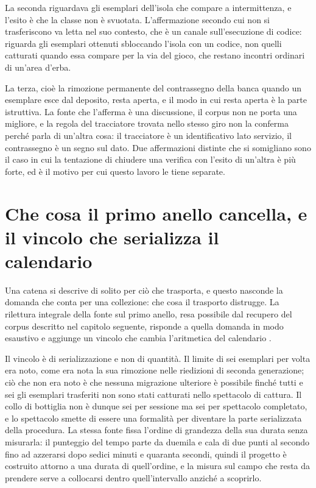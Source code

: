 La seconda riguardava gli esemplari dell'isola che compare a intermittenza, e l'esito è che la classe non è svuotata. L'affermazione secondo cui non si trasferiscono va letta nel suo contesto, che è un canale sull'esecuzione di codice: riguarda gli esemplari ottenuti sbloccando l'isola con un codice, non quelli catturati quando essa compare per la via del gioco, che restano incontri ordinari di un'area d'erba.

La terza, cioè la rimozione permanente del contrassegno della banca quando un esemplare esce dal deposito, resta aperta, e il modo in cui resta aperta è la parte istruttiva. La fonte che l'afferma è una discussione, il corpus non ne porta una migliore, e la regola del tracciatore trovata nello stesso giro non la conferma perché parla di un'altra cosa: il tracciatore è un identificativo lato servizio, il contrassegno è un segno sul dato. Due affermazioni distinte che si somigliano sono il caso in cui la tentazione di chiudere una verifica con l'esito di un'altra è più forte, ed è il motivo per cui questo lavoro le tiene separate.

\section{Che cosa il primo anello cancella, e il vincolo che serializza il calendario}

Una catena si descrive di solito per ciò che trasporta, e questo nasconde la domanda che conta per una collezione: che cosa il trasporto distrugge. La rilettura integrale della fonte sul primo anello, resa possibile dal recupero del corpus descritto nel capitolo seguente, risponde a quella domanda in modo esaustivo e aggiunge un vincolo che cambia l'aritmetica del calendario \cite{bulbapedia-pal-park}.

Il vincolo è di serializzazione e non di quantità. Il limite di sei esemplari per volta era noto, come era nota la sua rimozione nelle riedizioni di seconda generazione; ciò che non era noto è che nessuna migrazione ulteriore è possibile finché tutti e sei gli esemplari trasferiti non sono stati catturati nello spettacolo di cattura. Il collo di bottiglia non è dunque sei per sessione ma sei per spettacolo completato, e lo spettacolo smette di essere una formalità per diventare la parte serializzata della procedura. La stessa fonte fissa l'ordine di grandezza della sua durata senza misurarla: il punteggio del tempo parte da duemila e cala di due punti al secondo fino ad azzerarsi dopo sedici minuti e quaranta secondi, quindi il progetto è costruito attorno a una durata di quell'ordine, e la misura sul campo che resta da prendere serve a collocarsi dentro quell'intervallo anziché a scoprirlo.

